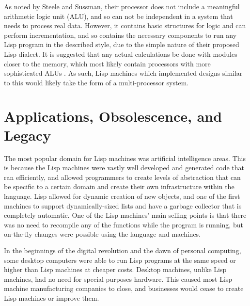 \documentclass[journal]{IEEEtran}
\begin{document}
As noted by Steele and Sussman, their processor does not include a meaningful arithmetic logic unit (ALU), and so can not be independent in a system that needs to process real data. However, it contains basic structures for logic and can perform incrementation, and so contains the necessary components to run any Lisp program in the described style, due to the simple nature of their proposed Lisp dialect. It is suggested that any actual calculations be done with modules closer to the memory, which most likely contain processors with more sophisticated ALUs \cite{ss}. As such, Lisp machines which implemented designs similar to this would likely take the form of a multi-processor system.

\section{Applications, Obsolescence, and Legacy}
The most popular domain for Lisp machines was  artificial intelligence areas.  This is because the Lisp machines were vastly well developed and generated code that ran efficiently, and allowed programmers to create levels of abstraction that can be specific to a certain domain and create their own infrastructure within the language. Lisp allowed for dynamic creation of new objects, and one of the first machines to support dynamically-sized lists and have a garbage collector that is completely automatic. One of the Lisp machines' main selling points is that there was no need to recompile any of the functions while the program is running, but on-the-fly changes were possible using the language and machines.

In the beginnings of the digital revolution and the dawn of personal computing, some desktop computers were able to run Lisp programs at the same speed or higher than Lisp machines at cheaper costs. Desktop machines, unlike Lisp machines, had no need for special purposes hardware. This caused most Lisp machine manufacturing companies to close, and businesses would cease to create Lisp machines or improve them.


%
%
\end{document}
